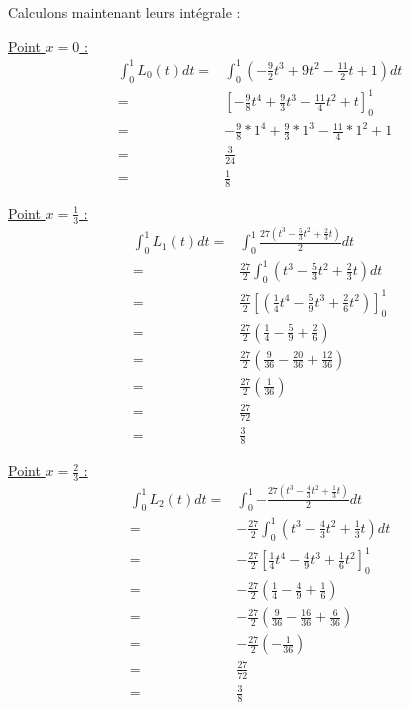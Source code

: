 \documentclass{article}
\begin{document}
\begin{enumerate}
Calculons maintenant leurs intégrale :

\underline{Point $x = 0$ :}
\begin{equation*}
  \begin{split}
    \int_0^1 {L_0(t)dt} = & \int_0^1 {\left( - \frac{9}{2}t^3 + 9 t^2
      - \frac{11}{2}t + 1 \right) dt}\\
    = &  \left[ - \frac{9}{8}t^4 + \frac{9}{3} t^3
      - \frac{11}{4} t^2 + t  \right]_0^1 \\
    = & - \frac{9}{8} * 1^4 + \frac{9}{3} * 1^3 -
    \frac{11}{4} * 1^2 + 1 \\
    = & \frac{3}{24} \\
    = & \frac{1}{8}
  \end{split}
\end{equation*}

\underline{Point $x = \frac{1}{3}$ :}
\begin{equation*}
  \begin{split}
    \int_0^1 {L_1(t) dt} = & \int_0^1 {\frac{27 (t^3 - \frac{5}{3}t^2 + \frac{2}{3}t)}
      {2} dt} \\
    = & \frac{27}{2} \int_0^1 { \left( t^3 - \frac{5}{3}t^2 + \frac{2}{3}t \right) 
      dt} \\
    = & \frac{27}{2} \left[ \left( \frac{1}{4}t^4 - \frac{5}{9}t^3 +
      \frac{2}{6}t^2 \right) \right]_0^1 \\
    = & \frac{27}{2} \left( \frac{1}{4} - \frac{5}{9} + \frac{2}{6} \right)  \\
    = & \frac{27}{2} \left( \frac{9}{36} - \frac{20}{36} + \frac{12}{36} \right)  \\
    = & \frac{27}{2} \left(  \frac{1}{36} \right)  \\
    = & \frac{27}{72} \\
    = & \frac{3}{8}
  \end{split}
\end{equation*}

\underline{Point $x = \frac{2}{3}$ :}
\begin{equation*}
  \begin{split}
    \int_0^1 {L_2(t) dt} = & \int_0^1 {- \frac{27 (t^3 - \frac{4}{3}t^2 + \frac{1}{3}t)}
    {2} dt }
    \\
    = & - \frac{27}{2} \int_0^1 { \left( t^3 - \frac{4}{3}t^2 +
      \frac{1}{3}t \right) dt }
    \\
    = & - \frac{27}{2} \left[ \frac{1}{4}t^4 - \frac{4}{9}t^3 +
      \frac{1}{6}t^2 \right]_0^1
    \\
    = & - \frac{27}{2} \left( \frac{1}{4} - \frac{4}{9} + \frac{1}{6} \right) 
    \\
    = & - \frac{27}{2} \left( \frac{9}{36} - \frac{16}{36} +
    \frac{6}{36} \right)
    \\
    = & - \frac{27}{2} \left( - \frac{1}{36} \right) 
    \\
    = & \frac{27}{72}
    \\
    = & \frac{3}{8}
    \\
  \end{split}
\end{equation*}


\end{enumerate}
\end{document}
